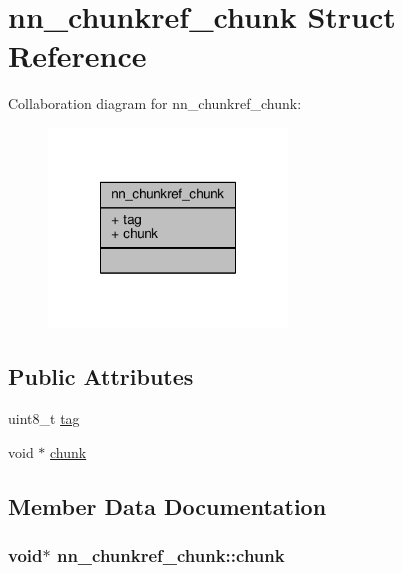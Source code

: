 \hypertarget{structnn__chunkref__chunk}{}\section{nn\+\_\+chunkref\+\_\+chunk Struct Reference}
\label{structnn__chunkref__chunk}


Collaboration diagram for nn\+\_\+chunkref\+\_\+chunk\+:\nopagebreak
\begin{figure}[H]
\begin{center}
\leavevmode
\includegraphics[width=180pt]{structnn__chunkref__chunk__coll__graph}
\end{center}
\end{figure}
\subsection*{Public Attributes}
\begin{DoxyCompactItemize}
\item 
uint8\+\_\+t \hyperlink{structnn__chunkref__chunk_abebb831eac6444be41bc134715a334b1}{tag}
\item 
void $\ast$ \hyperlink{structnn__chunkref__chunk_aa28fcd92116bdc5b636f1f76f93ddc0e}{chunk}
\end{DoxyCompactItemize}


\subsection{Member Data Documentation}
\subsubsection[{chunk}]{\setlength{\rightskip}{0pt plus 5cm}void$\ast$ nn\+\_\+chunkref\+\_\+chunk\+::chunk}\hypertarget{structnn__chunkref__chunk_aa28fcd92116bdc5b636f1f76f93ddc0e}{}\label{structnn__chunkref__chunk_aa28fcd92116bdc5b636f1f76f93ddc0e}
